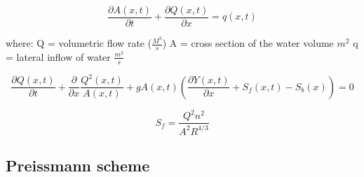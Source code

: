 \begin{equation}	
\frac{\partial A(x,t)}{\partial t} + \frac{\partial Q(x,t)}{\partial x}=q(x,t)
\label{saintbernard_mass}
\end{equation}

where:
	Q = volumetric flow rate ($\frac{M^3}{s}$)
	A = cross section of the water volume $m^2$
	q = lateral inflow of water $\frac{m^2}{s}$



\begin{equation}
	\frac{\partial Q(x,t)}{\partial t} + \frac{\partial}{\partial x} \frac{Q^2(x,t)}{A(x,t)}+ g A(x,t) (\frac{\partial Y(x,t)}{\partial x} +S_f(x,t)-S_b(x)) = 0
\label{saintbernard_momentum}
\end{equation}

\begin{equation}
	S_f = \frac{Q^2n^2}{A^2R^{4/3}}
\label{Manning_formula}
\end{equation}
\subsection{Preissmann scheme}\label{subse:preissmann_scheme}



